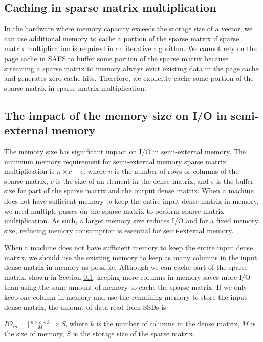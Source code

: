 \subsection{Caching in sparse matrix multiplication} \label{sec:cache}
In the hardware where memory capacity exceeds the storage size of a vector, we
can use additional memory to cache a portion of the sparse matrix if sparse matrix
multiplication is required in an iterative algorithm. We cannot rely on
the page cache in SAFS \cite{sa-cache} to buffer some portion of the sparse matrix
because streaming a sparse matrix to memory always evict existing data in the page
cache and generates zero cache hits. Therefore, we explicitly cache some portion
of the sparse matrix in sparse matrix multiplication. 

\subsection{The impact of the memory size on I/O in semi-external memory}
\label{sec:mem}
The memory size has significant impact on I/O in semi-external memory.
The minimum memory requirement for semi-external memory sparse matrix
multiplication is $n \times c + \epsilon$, where $n$ is the number of rows or
columns of the sparse matrix, $c$ is the size of an element in the dense matrix,
and $\epsilon$ is the buffer size for part of the sparse matrix and the output
dense matrix. When a machine does not have sufficient memory to keep the entire
input dense matrix in memory, we need multiple passes on the sparse matrix to
perform sparse matrix multiplication. As such, a larger memory size reduces I/O
and for a fixed memory size, reducing memory consumption is
essential for semi-external memory.

When a machine does not have sufficient memory to keep the entire input dense
matrix, we should use the existing memory to keep as many columns
in the input dense matrix in memory as possible. Although
we can cache part of the sparse matrix, shown in Section \ref{sec:cache},
keeping more columns in memory saves more I/O than using the same amount of
memory to cache the sparse matrix. If we only keep one column in memory and
use the remaining memory to store the input dense matrix, the amount of data
read from SSDs is

$IO_{in} = \lceil \frac{n \times c \times k}{M} \rceil \times S$, where $k$
is the number of columns in the dense matrix, $M$ is the size of memory,
$S$ is the storage size of the sparse matrix.

